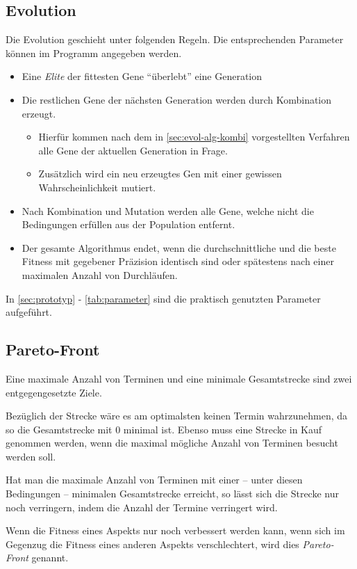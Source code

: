\subsection{Evolution}
Die Evolution geschieht unter folgenden Regeln.
Die entsprechenden Parameter können im Programm angegeben werden.
\begin{itemize}
    \item Eine \emph{Elite} der fittesten Gene \enquote{überlebt} eine Generation
    \item Die restlichen Gene der nächsten Generation werden durch Kombination erzeugt.
    \begin{itemize}
        \item Hierfür kommen nach dem in \autoref{sec:evol-alg-kombi} vorgestellten Verfahren alle Gene der aktuellen Generation in Frage.
        \item Zusätzlich wird ein neu erzeugtes Gen mit einer gewissen Wahrscheinlichkeit mutiert.
    \end{itemize}
    \item Nach Kombination und Mutation werden alle Gene, welche nicht die Bedingungen erfüllen aus der Population entfernt.
    \item Der gesamte Algorithmus endet, wenn die durchschnittliche und die beste Fitness mit gegebener Präzision identisch sind oder spätestens nach einer maximalen Anzahl von Durchläufen.
\end{itemize}

\noindent
In \autoref{sec:prototyp} - \autoref{tab:parameter} sind die praktisch genutzten Parameter aufgeführt.

\subsection{Pareto-Front}
Eine maximale Anzahl von Terminen und eine minimale Gesamtstrecke sind zwei entgegengesetzte Ziele.

Bezüglich der Strecke wäre es am optimalsten keinen Termin wahrzunehmen,
da so die Gesamtstrecke mit $0$ minimal ist.
Ebenso muss eine Strecke in Kauf genommen werden,
wenn die maximal mögliche Anzahl von Terminen besucht werden soll.

Hat man die maximale Anzahl von Terminen mit einer -- unter diesen Bedingungen -- minimalen Gesamtstrecke erreicht,
so lässt sich die Strecke nur noch verringern, indem die Anzahl der Termine verringert wird.

Wenn die Fitness eines Aspekts nur noch verbessert werden kann,
wenn sich im Gegenzug die Fitness eines anderen Aspekts verschlechtert,
wird dies \emph{Pareto-Front} genannt.

